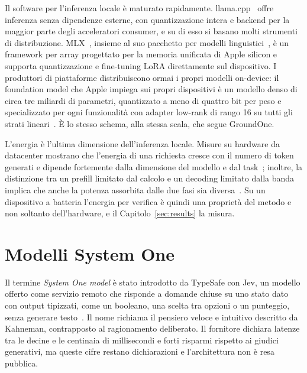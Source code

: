 Il software per l'inferenza locale è maturato rapidamente. llama.cpp~\cite{llamacpp} offre inferenza senza dipendenze
esterne, con quantizzazione intera e backend per la maggior parte degli acceleratori consumer, e su di esso si basano
molti strumenti di distribuzione. MLX~\cite{mlx2023}, insieme al suo pacchetto per modelli linguistici~\cite{mlxlm}, è un
framework per array progettato per la memoria unificata di Apple silicon e supporta quantizzazione e fine-tuning LoRA
direttamente sul dispositivo. I produttori di piattaforme distribuiscono ormai i propri modelli on-device: il foundation
model che Apple impiega sui propri dispositivi è un modello denso di circa tre miliardi di parametri, quantizzato a meno
di quattro bit per peso e specializzato per ogni funzionalità con adapter low-rank di rango 16 su tutti gli strati
lineari~\cite{gunter2024apple}. È lo stesso schema, alla stessa scala, che segue GroundOne.

L'energia è l'ultima dimensione dell'inferenza locale. Misure su hardware da datacenter mostrano che l'energia di una
richiesta cresce con il numero di token generati e dipende fortemente dalla dimensione del modello e dal
task~\cite{samsi2023words,luccioni2024power}; inoltre, la distinzione tra un prefill limitato dal calcolo e un decoding
limitato dalla banda implica che anche la potenza assorbita dalle due fasi sia diversa~\cite{patel2024splitwise}. Su un
dispositivo a batteria l'energia per verifica è quindi una proprietà del metodo e non soltanto dell'hardware, e il
Capitolo~\ref{sec:results} la misura.

\section{Modelli System One}
\label{sec:bg-systemone}

Il termine \emph{System One model} è stato introdotto da TypeSafe con Jev, un modello offerto come servizio remoto che
risponde a domande chiuse su uno stato dato con output tipizzati, come un booleano, una scelta tra opzioni o un
punteggio, senza generare testo~\cite{typesafe2026jev}. Il nome richiama il pensiero veloce e intuitivo descritto da
Kahneman, contrapposto al ragionamento deliberato. Il fornitore dichiara latenze tra le decine e le centinaia di
millisecondi e forti risparmi rispetto ai giudici generativi, ma queste cifre restano dichiarazioni e l'architettura non
è resa pubblica.

